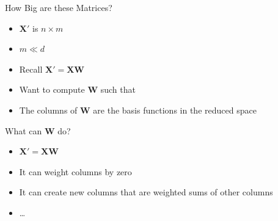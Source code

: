 \documentclass[aspectratio=169]{beamer}
\begin{document}
\begin{frame}{How Big are these Matrices?}

\begin{itemize}
\item $\textbf{X}'$ is $n \times m$
\item $m \ll d$
\item Recall $\textbf{X}' = \textbf{X} \textbf{W}$
\item Want to compute $\textbf{W}$ such that 
\item The columns of $\textbf{W}$ are the basis functions in the reduced space
\end{itemize}
\end{frame}
\begin{frame}{What can \textbf{W} do?}

\begin{itemize}
\item $\textbf{X}' = \textbf{X} \textbf{W}$
\item It can weight columns by zero
\item It can create new columns that are weighted sums of other columns
\item \ldots
\end{itemize}
\end{frame}
\end{document}
